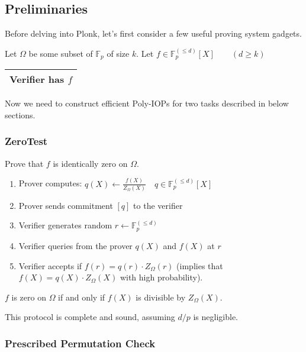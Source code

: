 \documentclass[../lecture-notes.tex]{subfiles}
\begin{document}
\subsection{Preliminaries}

Before delving into Plonk, let's first consider a few useful proving system gadgets.

Let $\Omega$ be some subset of $\mathbb{F}_p$ of size $k$.
Let $f \in \mathbb{F}_p^{(\leq d)}[X] \qquad (d \geq k)$ \hfill \begin{tabular}{|c|}\hline Verifier has $f$ \\ \hline \end{tabular} 

Now we need to construct efficient Poly-IOPs for two tasks described in below sections.

\subsubsection{ZeroTest}

Prove that $f$ is identically zero on $\Omega$.

\begin{enumerate}
    \item Prover computes: \( q(X) \leftarrow \frac{f(X)}{Z_{\Omega}(X)} \quad q \in \mathbb{F}_p^{(\leq d)}[X] \)
    \item Prover sends commitment \(\left[ q \right]\) to the verifier
    \item Verifier generates random \(r \leftarrow\mathbb{F}_p^{(\leq d)} \)
    \item Verifier queries from the prover \(q(X)\) and \(f(X)\) at \(r\)
    \item Verifier accepts if $f(r) = q(r) \cdot Z_{\Omega}(r)$ (implies that $f(X) = q(X) \cdot Z_{\Omega}(X)$ with high probability).
\end{enumerate}

\begin{lemma}
    $f$ is zero on $\Omega$ if and only if $f(X)$ is divisible by $Z_{\Omega}(X)$.
\end{lemma}

\begin{remark}
This protocol is complete and sound, assuming $d/p$ is negligible.
\end{remark}

\subsubsection{Prescribed Permutation Check}
\end{document}

